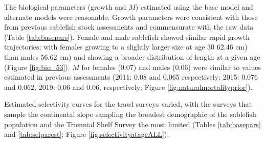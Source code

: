 \documentclass[11pt,
  english,
  a4paper,
]{article}
\begin{document}
The biological parameters (growth and {\(M\)\leavevmode\tagmcend\tagstructend}) estimated using the base model and alternate models were reasonable. Growth parameters were consistent with those from previous sablefish stock assessments and commensurate with the raw data (Table \ref{tab:basepars}). Female and male sablefish showed similar rapid growth trajectories; with females growing to a slightly larger size at age 30 62.46 cm) than males 56.62 cm) and showing a broader distribution of length at a given age (Figure \ref{fig:bio_53}). {\(M\)\leavevmode\tagmcend\tagstructend} for females (0.07) and males (0.06) were similar to values estimated in previous assessments (2011: 0.08 and 0.065 respectively; 2015: 0.076 and 0.062, 2019: 0.06 and 0.06, respectively; Figure \ref{fig:naturalmortalityprior}).

\leavevmode\tagmcend\tagstructend\par

Estimated selectivity curves for the trawl surveys varied, with the surveys that sample the continental slope sampling the broadest demographic of the sablefish population and the Triennial Shelf Survey the most limited (Tables \ref{tab:basepars} and \ref{tab:selparest}; Figure \ref{fig:selectivityatageALL}).

\end{document}
